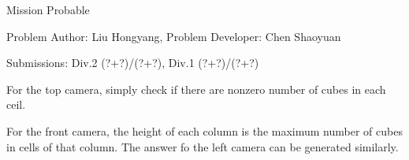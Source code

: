 \begin{Solution}{Mission Probable}

\begin{frame}{\ProblemName}

\small Problem Author: Liu Hongyang, Problem Developer: Chen Shaoyuan \par \vspace{0.3cm}

\small Submissions: Div.2 (?+?)/(?+?), Div.1 (?+?)/(?+?)  \par \vspace{0.5cm}

For the top camera, simply check if there are nonzero number of cubes in each ceil.

\par

For the front camera, the height of each column is the maximum number of cubes in cells of that column. The answer fo the left camera can be generated similarly.

\end{frame}

\end{Solution}
